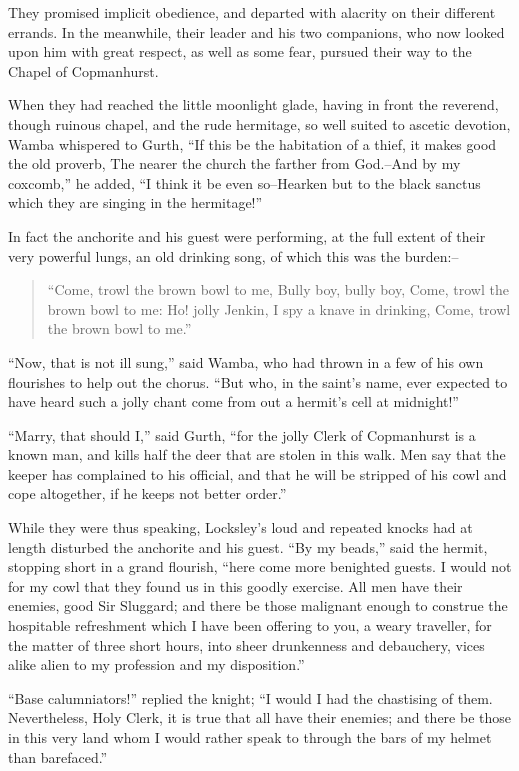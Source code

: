 They promised implicit obedience, and departed with alacrity on their
different errands. In the meanwhile, their leader and his two
companions, who now looked upon him with great respect, as well as some
fear, pursued their way to the Chapel of Copmanhurst.

When they had reached the little moonlight glade, having in front the
reverend, though ruinous chapel, and the rude hermitage, so well suited
to ascetic devotion, Wamba whispered to Gurth, ``If this be the
habitation of a thief, it makes good the old proverb, The nearer the
church the farther from God.--And by my coxcomb,'' he added, ``I think
it be even so--Hearken but to the black sanctus which they are singing
in the hermitage!''

In fact the anchorite and his guest were performing, at the full extent
of their very powerful lungs, an old drinking song, of which this was
the burden:--

\begin{quote}
``Come, trowl the brown bowl to me,
Bully boy, bully boy,
Come, trowl the brown bowl to me:
Ho! jolly Jenkin, I spy a knave in drinking,
Come, trowl the brown bowl to me.''
\end{quote}

``Now, that is not ill sung,'' said Wamba, who had thrown in a few of
his own flourishes to help out the chorus. ``But who, in the saint's
name, ever expected to have heard such a jolly chant come from out a
hermit's cell at midnight!''

``Marry, that should I,'' said Gurth, ``for the jolly Clerk of
Copmanhurst is a known man, and kills half the deer that are stolen in
this walk. Men say that the keeper has complained to his official, and
that he will be stripped of his cowl and cope altogether, if he keeps
not better order.''

While they were thus speaking, Locksley's loud and repeated knocks had
at length disturbed the anchorite and his guest. ``By my beads,'' said
the hermit, stopping short in a grand flourish, ``here come more
benighted guests. I would not for my cowl that they found us in this
goodly exercise. All men have their enemies, good Sir Sluggard; and
there be those malignant enough to construe the hospitable refreshment
which I have been offering to you, a weary traveller, for the matter of
three short hours, into sheer drunkenness and debauchery, vices alike
alien to my profession and my disposition.''

``Base calumniators!'' replied the knight; ``I would I had the
chastising of them. Nevertheless, Holy Clerk, it is true that all have
their enemies; and there be those in this very land whom I would rather
speak to through the bars of my helmet than barefaced.''

